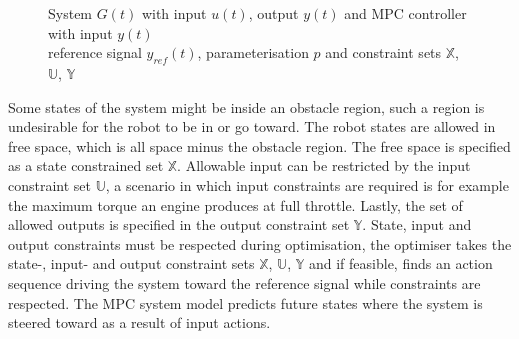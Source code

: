 \begin{figure}[H]
\centering
{}
\caption{System $G(t)$ with input ${u}(t)$, output $y(t)$ and \acs{MPC} controller with input $y(t)$\\reference signal $y_{ref}(t)$, parameterisation $p$ and constraint sets $\mathbb{X}$, $\mathbb{U}$, $\mathbb{Y}$} \label{figure: mpc_block_diagam} \end{figure}

Some states of the system might be inside an obstacle region, such a region is undesirable for the robot to be in or go toward. The robot states are allowed in free space, which is all space minus the obstacle region. The free space is specified as a state constrained set $\mathbb{X}$. Allowable input can be restricted by the input constraint set $\mathbb{U}$, a scenario in which input constraints are required is for example the maximum torque an engine produces at full throttle. Lastly, the set of allowed outputs is specified in the output constraint set $\mathbb{Y}$. State, input and output constraints must be respected during optimisation, the optimiser takes the state-, input- and output constraint sets $\mathbb{X}$, $\mathbb{U}$, $\mathbb{Y}$ and if feasible, finds an action sequence driving the system toward the reference signal while constraints are respected. The \ac{MPC} system model predicts future states where the system is steered toward as a result of input actions.\\

